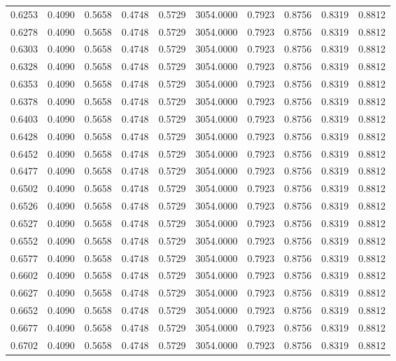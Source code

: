 \begin{tabular}{rrrrrrrrrr}
0.6253 & 0.4090 & 0.5658 & 0.4748 & 0.5729 & 3054.0000 & 0.7923 & 0.8756 & 0.8319 & 0.8812 \\
0.6278 & 0.4090 & 0.5658 & 0.4748 & 0.5729 & 3054.0000 & 0.7923 & 0.8756 & 0.8319 & 0.8812 \\
0.6303 & 0.4090 & 0.5658 & 0.4748 & 0.5729 & 3054.0000 & 0.7923 & 0.8756 & 0.8319 & 0.8812 \\
0.6328 & 0.4090 & 0.5658 & 0.4748 & 0.5729 & 3054.0000 & 0.7923 & 0.8756 & 0.8319 & 0.8812 \\
0.6353 & 0.4090 & 0.5658 & 0.4748 & 0.5729 & 3054.0000 & 0.7923 & 0.8756 & 0.8319 & 0.8812 \\
0.6378 & 0.4090 & 0.5658 & 0.4748 & 0.5729 & 3054.0000 & 0.7923 & 0.8756 & 0.8319 & 0.8812 \\
0.6403 & 0.4090 & 0.5658 & 0.4748 & 0.5729 & 3054.0000 & 0.7923 & 0.8756 & 0.8319 & 0.8812 \\
0.6428 & 0.4090 & 0.5658 & 0.4748 & 0.5729 & 3054.0000 & 0.7923 & 0.8756 & 0.8319 & 0.8812 \\
0.6452 & 0.4090 & 0.5658 & 0.4748 & 0.5729 & 3054.0000 & 0.7923 & 0.8756 & 0.8319 & 0.8812 \\
0.6477 & 0.4090 & 0.5658 & 0.4748 & 0.5729 & 3054.0000 & 0.7923 & 0.8756 & 0.8319 & 0.8812 \\
0.6502 & 0.4090 & 0.5658 & 0.4748 & 0.5729 & 3054.0000 & 0.7923 & 0.8756 & 0.8319 & 0.8812 \\
0.6526 & 0.4090 & 0.5658 & 0.4748 & 0.5729 & 3054.0000 & 0.7923 & 0.8756 & 0.8319 & 0.8812 \\
0.6527 & 0.4090 & 0.5658 & 0.4748 & 0.5729 & 3054.0000 & 0.7923 & 0.8756 & 0.8319 & 0.8812 \\
0.6552 & 0.4090 & 0.5658 & 0.4748 & 0.5729 & 3054.0000 & 0.7923 & 0.8756 & 0.8319 & 0.8812 \\
0.6577 & 0.4090 & 0.5658 & 0.4748 & 0.5729 & 3054.0000 & 0.7923 & 0.8756 & 0.8319 & 0.8812 \\
0.6602 & 0.4090 & 0.5658 & 0.4748 & 0.5729 & 3054.0000 & 0.7923 & 0.8756 & 0.8319 & 0.8812 \\
0.6627 & 0.4090 & 0.5658 & 0.4748 & 0.5729 & 3054.0000 & 0.7923 & 0.8756 & 0.8319 & 0.8812 \\
0.6652 & 0.4090 & 0.5658 & 0.4748 & 0.5729 & 3054.0000 & 0.7923 & 0.8756 & 0.8319 & 0.8812 \\
0.6677 & 0.4090 & 0.5658 & 0.4748 & 0.5729 & 3054.0000 & 0.7923 & 0.8756 & 0.8319 & 0.8812 \\
0.6702 & 0.4090 & 0.5658 & 0.4748 & 0.5729 & 3054.0000 & 0.7923 & 0.8756 & 0.8319 & 0.8812 \\

\end{tabular}
